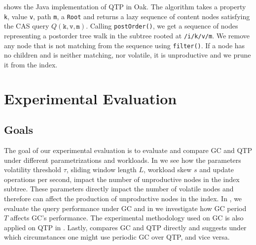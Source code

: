 \documentclass[abstracton,12pt]{scrartcl}
\theoremstyle{definition}
\begin{document}
\vspace{-0.2cm}

 shows the Java implementation of QTP in Oak. The algorithm
takes a property \texttt{k}, value \texttt{v}, path \texttt{m}, a
\texttt{Root} and returns a lazy sequence of content nodes satisfying
the CAS query $Q(\texttt{k},\texttt{v},\texttt{m})$. Calling
\texttt{postOrder()}, we get a sequence of nodes representing a
postorder tree walk in the subtree rooted at \texttt{/i/k/v/m}. We remove any
node that is not
matching from the sequence using \texttt{filter()}. If a node has no children
and is neither matching,
nor volatile, it is unproductive and we prune it from the index.

\newpage

\section{Experimental Evaluation}

\label{sec:experimental-evaluation}

\subsection{Goals}

The goal of our experimental evaluation is to evaluate and 
compare GC and QTP under different parametrizations and workloads.
In  we
see how the parameters volatility threshold $\tau$, sliding window length $L$,
workload skew $s$ and update operations per second, impact the number of unproductive
nodes in the index subtree.
These parameters directly impact the number of volatile nodes and therefore can affect
the production of unproductive nodes in the index.
In , we evaluate the query performance under GC and in
 we investigate how GC period $T$ affects GC's performance.
The experimental methodology used on GC is also applied on QTP in .
Lastly,  compares GC and QTP directly and suggests under which
circumstances one might use periodic GC over QTP, and vice versa.
\end{document}
